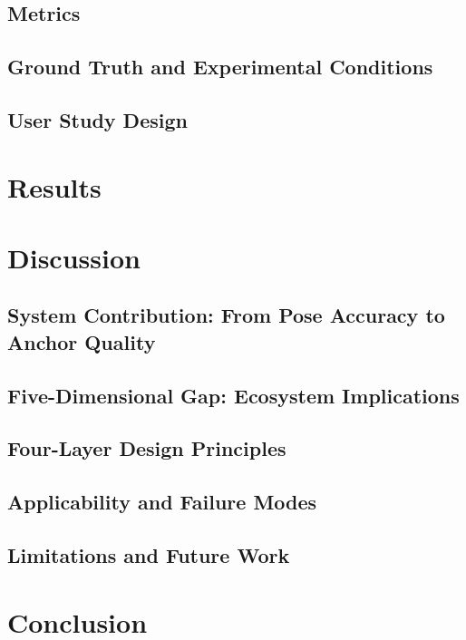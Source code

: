 \documentclass[review]{vgtc}
\begin{document}
\subsection{Metrics}

\subsection{Ground Truth and Experimental Conditions}

\subsection{User Study Design}

\section{Results}

\section{Discussion}

\subsection{System Contribution: From Pose Accuracy to Anchor Quality}

\subsection{Five-Dimensional Gap: Ecosystem Implications}

\subsection{Four-Layer Design Principles}

\subsection{Applicability and Failure Modes}

\subsection{Limitations and Future Work}

\section{Conclusion}

\nocite{*}


\end{document}
